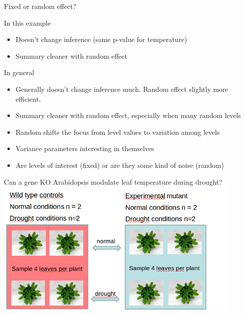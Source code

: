 \documentclass{beamer}
\begin{document}
\begin{frame}{Fixed or random effect?}
  \begin{block}{In this example}
   \begin{itemize}
    \item Doesn't change inference (same p-value for temperature)
    \item Summary cleaner with random effect
   \end{itemize}
  \end{block}

  \pause
  
  \begin{block}{In general}
   \begin{itemize}
    \item Generally doesn't change inference much. Random effect slightly more efficient.
    \item Summary cleaner with random effect, especially when many random levels
    \item Random shifts the focus from level values to variation among levels
    \item Variance parameters interesting in themselves
    \item Are levels of interest (fixed) or are they some kind of noise (random)
   \end{itemize}
  \end{block}

\end{frame}


\begin{frame}{Can a gene KO Arabidopsis modulate leaf temperature during drought?}
 \centering
 \includegraphics[width=0.9\textwidth]{Figures/koara}
\end{frame}
\end{document}

